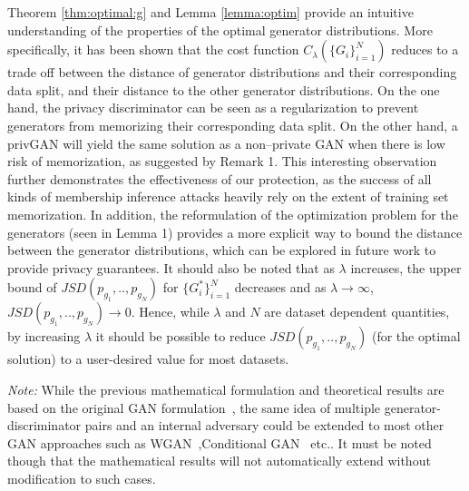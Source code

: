 \documentclass{article}
\begin{document}
Theorem \ref{thm:optimal:g} and Lemma \ref{lemma:optim} provide an intuitive understanding of the properties of the optimal generator distributions. More specifically, it has been shown that the cost function $C_\lambda(\{G_i\}_{i=1}^N)$ reduces to a trade off between the distance of generator distributions and their corresponding data split, and their distance to the other generator distributions. On the one hand, the privacy discriminator can be seen as a regularization to prevent generators from memorizing their corresponding data split.  On the other hand, a privGAN will yield the same solution as a non--private GAN when there is low risk of memorization, as suggested by Remark 1. This interesting observation further demonstrates the effectiveness of our protection, as the success of all kinds of membership inference attacks heavily rely on the extent of training set memorization. In addition, the reformulation of the optimization problem for the generators (seen in Lemma 1) provides a more explicit way to bound the distance between the generator distributions, which can be explored in future work to provide privacy guarantees. It should also be noted that as $\lambda$ increases, the upper bound of $JSD(p_{g_1},..,p_{g_N})$ for $\{G_i^*\}_{i=1}^N$ decreases and as $\lambda \rightarrow \infty$, $JSD(p_{g_1},..,p_{g_N}) \rightarrow 0$. Hence, while $\lambda$ and $N$ are dataset dependent quantities, by increasing $\lambda$ it should be possible to reduce $JSD(p_{g_1},..,p_{g_N})$ (for the optimal solution) to a user-desired value for most datasets.

{\it Note:} While the previous mathematical formulation and theoretical results are based on the original GAN formulation~\cite{goodfellow2014generative}, the same idea of multiple generator-discriminator pairs and an internal adversary could be extended to most other GAN approaches such as WGAN~\cite{arjovsky2017wasserstein},Conditional GAN~\cite{mirza2014conditional} etc.. It must be noted though that the mathematical results will not automatically extend without modification to such cases. 
\end{document}
